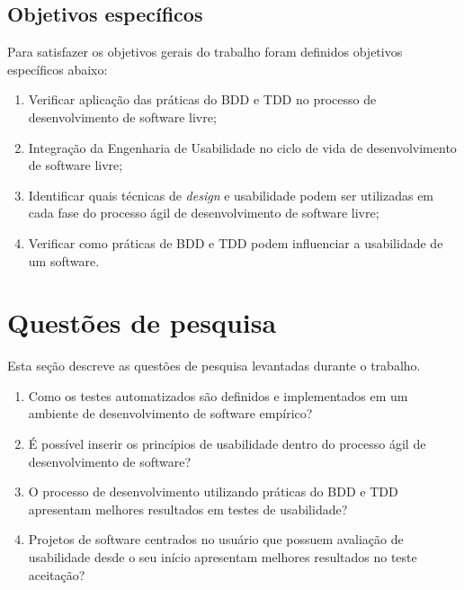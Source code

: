	 
\subsection{Objetivos específicos}

Para satisfazer os objetivos gerais do trabalho foram definidos objetivos específicos abaixo:

\begin{enumerate}
\item Verificar aplicação das práticas do BDD e TDD no processo de desenvolvimento de software livre;

\item Integração da Engenharia de Usabilidade no ciclo de vida de desenvolvimento de software livre;
\item Identificar quais técnicas de \emph{design} e usabilidade  podem ser utilizadas em cada fase do processo ágil de desenvolvimento de software livre;
\item Verificar como práticas de BDD e TDD podem influenciar a usabilidade de um software.


\end{enumerate}

\section{Questões de pesquisa}

Esta seção descreve as questões de pesquisa levantadas durante o trabalho.

\begin{enumerate}
\item Como os testes automatizados são definidos e implementados em um ambiente de desenvolvimento de software empírico?
\item É possível inserir os princípios de usabilidade dentro do processo ágil de desenvolvimento de software?
\item O processo de desenvolvimento utilizando práticas do BDD e TDD apresentam melhores resultados em testes de usabilidade?
\item Projetos de software centrados no usuário que possuem avaliação de usabilidade desde o seu início apresentam melhores resultados no teste aceitação?
\end{enumerate}
	 
